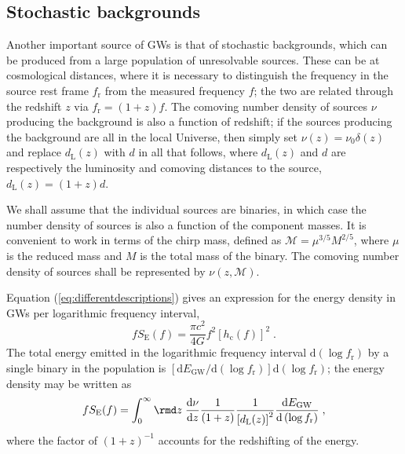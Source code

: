 \subsection{Stochastic backgrounds}\label{sec:stoch}

Another important source of GWs is that of stochastic backgrounds, which can be produced from a large population of unresolvable sources. These can be at cosmological distances, where it is necessary to distinguish the frequency in the source rest frame $f_{\mathrm{r}}$ from the measured frequency $f$; the two are related through the redshift $z$ via $f_{\mathrm{r}}=(1+z)f$. The comoving number density of sources $\nu$ producing the background is also a function of redshift; if the sources producing the background are all in the local Universe, then simply set $\nu(z) = \nu_0\delta (z)$ and replace $d_{\mathrm{L}}(z)$ with $d$ in all that follows, where $d_{\mathrm{L}}(z)$ and $d$ are respectively the luminosity and comoving distances to the source, $d_{\mathrm{L}}(z)=(1+z)d$.

We shall assume that the individual sources are binaries, in which case the number density of sources is also a function of the component masses. It is convenient to work in terms of the chirp mass, defined as ${\mathcal{M}}=\mu^{3/5}M^{2/5}$, where $\mu$ is the reduced mass and $M$ is the total mass of the binary. The comoving number density of sources shall be represented by $\nu(z, \mathcal{M})$.

Equation (\ref{eq:differentdescriptions}) gives an expression for the energy density in GWs per logarithmic frequency interval,
\begin{equation}\label{eq:stoch}
fS_{\mathrm{E}}(f)=\frac{\pi c^{2}}{4G}f^{2}\left[h_\mathrm{c}(f)\right]^2 \; .
\end{equation}
The total energy emitted in the logarithmic frequency interval $\mathrm{d}\left(\log f_{\mathrm{r}}\right)$ by a single binary in the population is $\left[\mathrm{d}E_{\mathrm{GW}}/\mathrm{d}(\log f_{\mathrm{r}})\right]\mathrm{d}(\log f_{\mathrm{r}})$; the energy density may be written as
\begin{equation}\label{eq:Phinney}
fS_{\mathrm{E}}(f) = \int_{0}^{\infty} \rmd z\; \frac{\mathrm{d}\nu}{\mathrm{d}z}\frac{1}{(1+z)}\frac{1}{\left[d_{\mathrm{L}}(z)\right]^2}\frac{\mathrm{d}E_{\mathrm{GW}}}{\mathrm{d}\left(\log f_{\mathrm{r}} \right)} \; , \end{equation}
where the factor of $\left( 1+z \right)^{-1}$ accounts for the redshifting of the energy.

